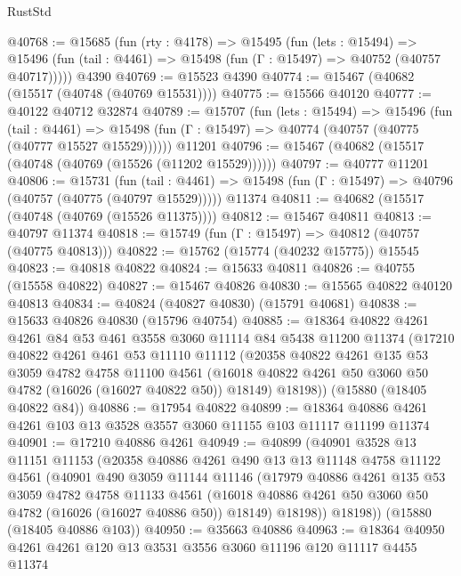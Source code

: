 \begin{lexlean}{RustStd}
\begin{coremodule}
@40768 := @15685
    (fun (rty : @4178) =>
    @15495
      (fun (lets : @15494) =>
      @15496 (fun (tail : @4461) => @15498 (fun (Γ : @15497) => @40752 (@40757 @40717)))))
    @4390
@40769 := @15523 @4390
@40774 := @15467 (@40682 (@15517 (@40748 (@40769 @15531))))
@40775 := @15566 @40120
@40777 := @40122 @40712 @32874
@40789 := @15707
    (fun (lets : @15494) =>
    @15496
      (fun (tail : @4461) =>
      @15498 (fun (Γ : @15497) => @40774 (@40757 (@40775 (@40777 @15527 @15529))))))
    @11201
@40796 := @15467 (@40682 (@15517 (@40748 (@40769 (@15526 (@11202 @15529))))))
@40797 := @40777 @11201
@40806 := @15731
    (fun (tail : @4461) => @15498 (fun (Γ : @15497) => @40796 (@40757 (@40775 (@40797 @15529)))))
    @11374
@40811 := @40682 (@15517 (@40748 (@40769 (@15526 @11375))))
@40812 := @15467 @40811
@40813 := @40797 @11374
@40818 := @15749 (fun (Γ : @15497) => @40812 (@40757 (@40775 @40813)))
@40822 := @15762 (@15774 (@40232 @15775)) @15545
@40823 := @40818 @40822
@40824 := @15633 @40811
@40826 := @40755 (@15558 @40822)
@40827 := @15467 @40826
@40830 := @15565 @40822 @40120 @40813
@40834 := @40824 (@40827 @40830) (@15791 @40681)
@40838 := @15633 @40826 @40830 (@15796 @40754)
@40885 := @18364
    @40822
    @4261
    @4261
    @84
    @53
    @461
    @3558
    @3060
    @11114
    @84
    @5438
    @11200
    @11374
    (@17210
      @40822
      @4261
      @461
      @53
      @11110
      @11112
      (@20358
        @40822
        @4261
        @135
        @53
        @3059
        @4782
        @4758
        @11100
        @4561
        (@16018 @40822 @4261 @50 @3060 @50 @4782 (@16026 (@16027 @40822 @50)) @18149)
        @18198))
    (@15880 (@18405 @40822 @84))
@40886 := @17954 @40822
@40899 := @18364 @40886 @4261 @4261 @103 @13 @3528 @3557 @3060 @11155 @103 @11117 @11199 @11374
@40901 := @17210 @40886 @4261
@40949 := @40899
    (@40901
      @3528
      @13
      @11151
      @11153
      (@20358
        @40886
        @4261
        @490
        @13
        @13
        @11148
        @4758
        @11122
        @4561
        (@40901
          @490
          @3059
          @11144
          @11146
          (@17979
            @40886
            @4261
            @135
            @53
            @3059
            @4782
            @4758
            @11133
            @4561
            (@16018 @40886 @4261 @50 @3060 @50 @4782 (@16026 (@16027 @40886 @50)) @18149)
            @18198))
        @18198))
    (@15880 (@18405 @40886 @103))
@40950 := @35663 @40886
@40963 := @18364 @40950 @4261 @4261 @120 @13 @3531 @3556 @3060 @11196 @120 @11117 @4455 @11374

\end{coremodule}
\end{lexlean}

